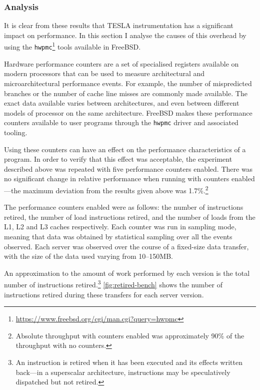 \subsubsection{Analysis}

It is clear from these results that TESLA instrumentation has a
significant impact on performance. In this section I analyse the causes
of this overhead by using the
\texttt{hwpmc}\footnote{\url{https://www.freebsd.org/cgi/man.cgi?query=hwpmc}}
tools available in FreeBSD.

Hardware performance counters are a set of specialised registers
available on modern processors that can be used to measure architectural
and microarchitectural performance events. For example, the number of
mispredicted branches or the number of cache line misses are commonly
made available. The exact data available varies between architectures,
and even between different models of processor on the same architecture.
FreeBSD makes these performance counters available to user programs
through the \texttt{hwpmc} driver and associated tooling.

Using these counters can have an effect on the performance
characteristics of a program. In order to verify that this effect was
acceptable, the experiment described above was repeated with five
performance counters enabled. There was no significant change in
relative performance when running with counters enabled---the maximum
deviation from the results given above was 1.7\%.\footnote{Absolute
throughput with counters enabled was approximately 90\% of the
throughput with no counters.}

The performance counters enabled were as follows: the number of
instructions retired, the number of load instructions retired, and the
number of loads from the L1, L2 and L3 caches respectively. Each counter
was run in sampling mode, meaning that data was obtained by statistical
sampling over all the events observed. Each server was observed over the
course of a fixed-size data transfer, with the size of the data used
varying from 10--150MB.

An approximation to the amount of work performed by each version is the
total number of instructions retired.\footnote{An instruction is retired
when it has been executed and its effects written back---in a
superscalar architecture, instructions may be speculatively dispatched
but not retired.} \autoref{fig:retired-bench} shows the number of
instructions retired during these transfers for each server version.

